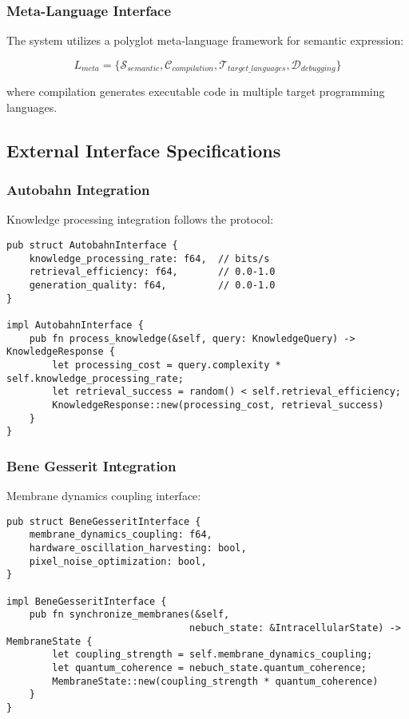 \documentclass[12pt,a4paper]{article}
\begin{document}
\subsubsection{Meta-Language Interface}

The system utilizes a polyglot meta-language framework for semantic expression:

\begin{equation}
L_{meta} = \{\mathcal{S}_{semantic}, \mathcal{C}_{compilation}, \mathcal{T}_{target\_languages}, \mathcal{D}_{debugging}\}
\end{equation}

where compilation generates executable code in multiple target programming languages.

\subsection{External Interface Specifications}

\subsubsection{Autobahn Integration}

Knowledge processing integration follows the protocol:

\begin{lstlisting}[style=ruststyle]
pub struct AutobahnInterface {
    knowledge_processing_rate: f64,  // bits/s
    retrieval_efficiency: f64,       // 0.0-1.0
    generation_quality: f64,         // 0.0-1.0
}

impl AutobahnInterface {
    pub fn process_knowledge(&self, query: KnowledgeQuery) -> KnowledgeResponse {
        let processing_cost = query.complexity * self.knowledge_processing_rate;
        let retrieval_success = random() < self.retrieval_efficiency;
        KnowledgeResponse::new(processing_cost, retrieval_success)
    }
}
\end{lstlisting}

\subsubsection{Bene Gesserit Integration}

Membrane dynamics coupling interface:

\begin{lstlisting}[style=ruststyle]
pub struct BeneGesseritInterface {
    membrane_dynamics_coupling: f64,
    hardware_oscillation_harvesting: bool,
    pixel_noise_optimization: bool,
}

impl BeneGesseritInterface {
    pub fn synchronize_membranes(&self, 
                                nebuch_state: &IntracellularState) -> MembraneState {
        let coupling_strength = self.membrane_dynamics_coupling;
        let quantum_coherence = nebuch_state.quantum_coherence;
        MembraneState::new(coupling_strength * quantum_coherence)
    }
}
\end{lstlisting}
\end{document}
